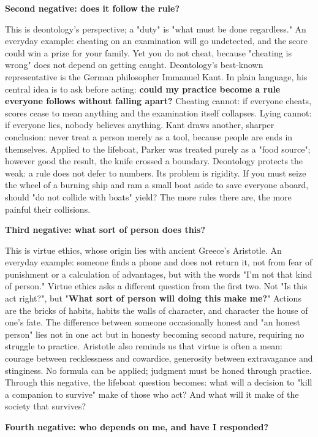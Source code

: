 \textbf{Second negative: does it follow the rule?}

This is deontology's perspective; a "duty" is "what must be done regardless." An everyday example: cheating on an examination will go undetected, and the score could win a prize for your family. Yet you do not cheat, because "cheating is wrong" does not depend on getting caught. Deontology's best-known representative is the German philosopher Immanuel Kant. In plain language, his central idea is to ask before acting: \textbf{could my practice become a rule everyone follows without falling apart?} Cheating cannot: if everyone cheats, scores cease to mean anything and the examination itself collapses. Lying cannot: if everyone lies, nobody believes anything. Kant draws another, sharper conclusion: never treat a person merely as a tool, because people are ends in themselves. Applied to the lifeboat, Parker was treated purely as a "food source"; however good the result, the knife crossed a boundary. Deontology protects the weak: a rule does not defer to numbers. Its problem is rigidity. If you must seize the wheel of a burning ship and ram a small boat aside to save everyone aboard, should "do not collide with boats" yield? The more rules there are, the more painful their collisions.

\textbf{Third negative: what sort of person does this?}

This is virtue ethics, whose origin lies with ancient Greece's Aristotle. An everyday example: someone finds a phone and does not return it, not from fear of punishment or a calculation of advantages, but with the words "I'm not that kind of person." Virtue ethics asks a different question from the first two. Not "Is this act right?", but "\textbf{What sort of person will doing this make me?}" Actions are the bricks of habits, habits the walls of character, and character the house of one's fate. The difference between someone occasionally honest and "an honest person" lies not in one act but in honesty becoming second nature, requiring no struggle to practice. Aristotle also reminds us that virtue is often a mean: courage between recklessness and cowardice, generosity between extravagance and stinginess. No formula can be applied; judgment must be honed through practice. Through this negative, the lifeboat question becomes: what will a decision to "kill a companion to survive" make of those who act? And what will it make of the society that survives?

\textbf{Fourth negative: who depends on me, and have I responded?}

